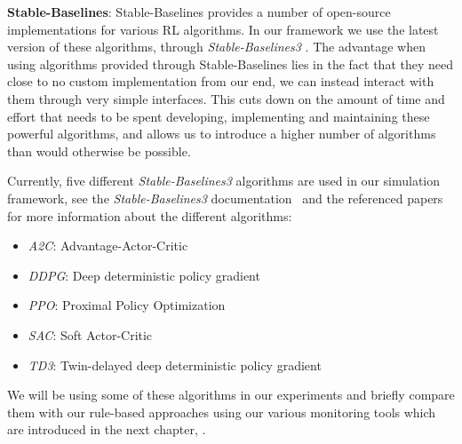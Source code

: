 \medskip
\noindent\textbf{Stable-Baselines}: Stable-Baselines provides a number of open-source implementations for various RL algorithms. In our framework we use the latest version of these algorithms, through \emph{Stable-Baselines3} \cite{StableBaselines3}. The advantage when using algorithms provided through Stable-Baselines lies in the fact that they need close to no custom implementation from our end, we can instead interact with them through very simple interfaces. This cuts down on the amount of time and effort that needs to be spent developing, implementing and maintaining these powerful algorithms, and allows us to introduce a higher number of algorithms than would otherwise be possible.

Currently, five different \emph{Stable-Baselines3} algorithms are used in our simulation framework, see the \emph{Stable-Baselines3} documentation~\cite{StableBaselines3Algorithms} and the referenced papers for more information about the different algorithms:
\begin{itemize}
	\item \emph{A2C}: Advantage-Actor-Critic \cite{StableBaselines3A2C}
	\item \emph{DDPG}: Deep deterministic policy gradient \cite{StableBaselines3DDPG}
	\item \emph{PPO}: Proximal Policy Optimization \cite{StableBaselines3PPO}
	\item \emph{SAC}: Soft Actor-Critic \cite{StableBaselines3SAC}
	\item \emph{TD3}: Twin-delayed deep deterministic policy gradient \cite{StableBaselines3TD3}
\end{itemize}
We will be using some of these algorithms in our experiments and briefly compare them with our rule-based approaches using our various monitoring tools which are introduced in the next chapter, .
